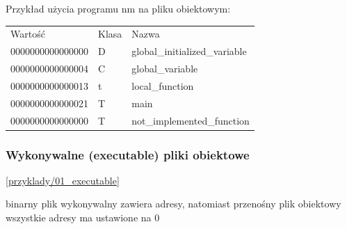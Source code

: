 \begin{frame}

  Przykład użycia programu nm na pliku obiektowym:
  \begin{table}[h]
    \begin{tabular}{lll}
      Wartość & Klasa & Nazwa\\
      0000000000000000&D&global\_initialized\_variable\\
      0000000000000004&C&global\_variable\\
      0000000000000013&t&local\_function\\
      0000000000000021&T&main\\
      0000000000000000&T&not\_implemented\_function\\
    \end{tabular}
  \end{table}
  
\end{frame}


\begin{frame}[t]\frametitle{Wykonywalne (executable) pliki obiektowe}
  
  [\url{przyklady/01_executable}]

  binarny plik wykonywalny zawiera adresy, natomiast przenośny plik obiektowy
  wszystkie adresy ma ustawione na 0

\end{frame}

